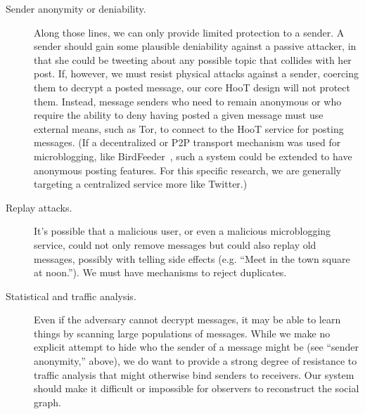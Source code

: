 \begin{description}
\item[Sender anonymity or deniability.] Along those lines, we can only
  provide limited protection to a sender. A sender should gain some plausible
  deniability against a passive attacker, in that she could be
  tweeting about any possible topic that collides with her post.
 If, however, we must resist physical attacks against a sender,
coercing them to decrypt a posted message, our core HooT design
will not protect them.
Instead, message senders who need to remain anonymous or who require the
ability to deny having posted a given message must use external means,
such as Tor, to connect to the HooT service for posting messages. (If a
decentralized or P2P transport mechanism was used for microblogging,
like BirdFeeder~\cite{sandler09}, such a system could be extended to have
anonymous posting features. For this specific research, we are
generally targeting a centralized service more like Twitter.)

\item[Replay attacks.] It's possible that a malicious user, or even a
  malicious microblogging service, could not only remove messages but
  could also replay old messages, possibly with telling side effects
  (e.g. ``Meet in the town square at noon.''). We must have 
  mechanisms to reject duplicates.

\item[Statistical and traffic analysis.] Even if the adversary cannot
  decrypt messages, it may be able to learn things by scanning large
  populations of \hoot messages. While we make no explicit attempt to hide who the
  sender of a message might be (see ``sender anonymity,'' above), we do
  want to provide a strong degree of resistance to traffic analysis that
  might otherwise bind senders to receivers. Our system should make it
  difficult or impossible for observers to reconstruct the social graph.


\end{description}

